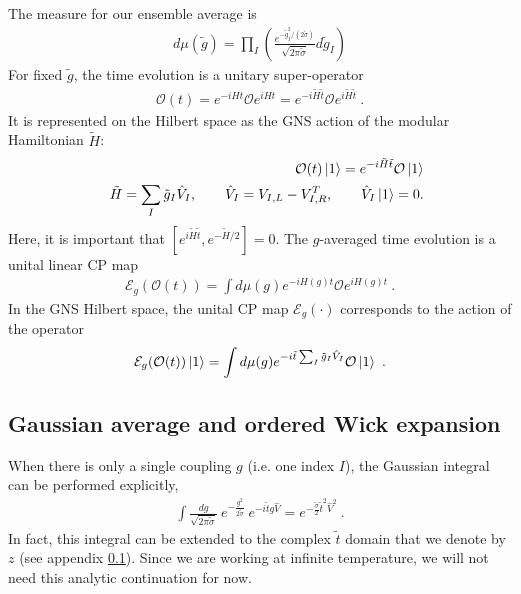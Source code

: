 \documentclass{article}
\theoremstyle{definition}
\newcommand{\nn}{\nonumber}
\newcommand{\lb}{\left(}
\newcommand{\rb}{\right)}
\newcommand{\mO}{\mathcal{O}}
\begin{document}
    The measure for our ensemble average is
    \begin{eqnarray}
        d\mu(\tilde{g})=\prod_I\lb
        \frac{e^{-\tilde{g}_I^2/(2\tilde{\sigma})}}{\sqrt{2\pi\tilde{\sigma}}} d\tilde{g}_I\rb
    \end{eqnarray}
    For fixed $\tilde{g}$, the time evolution is a unitary super-operator
    \begin{eqnarray}
        \mO(t)=e^{-i H t}\mO e^{i H t}=e^{-i \tilde{H}\tilde{t}} \mO e^{i\tilde{H}\tilde{t}}\ .
    \end{eqnarray}
    It is represented on the Hilbert space as the GNS action of the modular Hamiltonian
    $\tilde{H}$:
    \begin{eqnarray}
        &&\mO(t)\ket{1}=e^{-i \tilde{H} \tilde{t}}\mO\ket{1}\nn\\
        &&\tilde{H}=\sum_I \tilde{g}_I \hat{V}_{I},\qquad \hat{V}_I=V_{I,L}-V^T_{I,R},\qquad
        \hat{V}_I\ket{1}=0.
    \end{eqnarray}
    Here, it is important that $[e^{i \tilde{H} \tilde{t}},e^{-\tilde{H}/2}]=0$. The $g$-averaged time evolution is a unital linear CP map
    \begin{eqnarray}
        \mathcal{E}_g(\mO(t))=\int d\mu(g) e^{-i H(g) t}\mO e^{i H(g) t}\ .
    \end{eqnarray}
    In the GNS Hilbert space, the unital CP map $\mathcal{E}_{g}(\cdot)$
    corresponds to the action of the operator
    \begin{eqnarray}
        \mathcal{E}_g(\mO(t))\ket{1}=\int d\mu(g) e^{-i \tilde{t}\sum_I \tilde{g}_I\hat{V}_I }\mO\ket{1}\ .
    \end{eqnarray}

    \subsection{Gaussian average and ordered Wick expansion}

    When there is only a single coupling $g$ (i.e. one index $I$), the Gaussian
    integral can be performed explicitly,
    \begin{eqnarray}
        \int \frac{dg}{\sqrt{2\pi \tilde{\sigma}}}\:e^{-\frac{g^{2}}{2\tilde{\sigma}}}\:e^{-i\tilde{t}g\hat{V}}
        =e^{-\frac{\tilde{\sigma}}{2}\tilde{t}^2\hat{V}^2}\ .
    \end{eqnarray}
    In fact, this integral can be extended to the complex $\tilde{t}$ domain that we denote by $z$ (see appendix \ref{}). Since we are working at infinite temperature, we will not need this analytic continuation for now.
    
\end{document}
